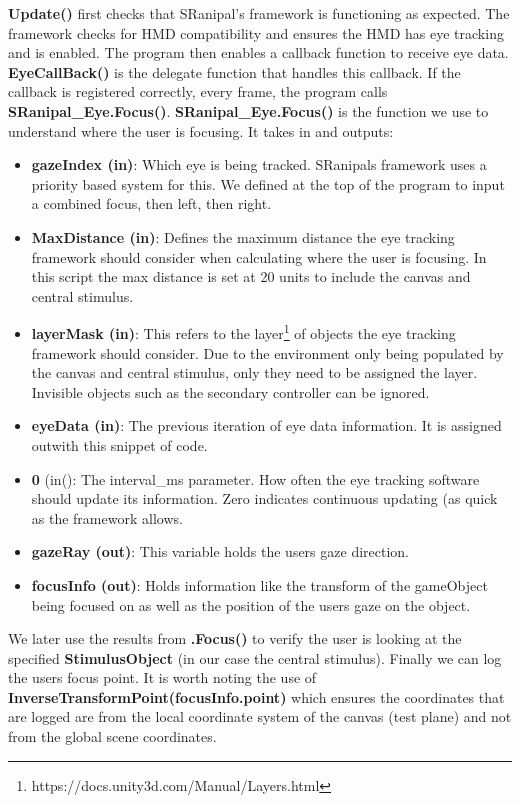 \documentclass{l4proj}
\begin{document}
\textbf{Update()} first checks that SRanipal's framework is functioning as expected. The framework checks for HMD compatibility and ensures the HMD has eye tracking and is enabled. The program then enables a callback function to receive eye data. \textbf{EyeCallBack()} is the delegate function that handles this callback. If the callback is registered correctly, every frame, the program calls \textbf{SRanipal\_Eye.Focus()}. 
\newline
\textbf{SRanipal\_Eye.Focus()} is the function we use to understand where the user is focusing. It takes in and outputs:
\begin{itemize}
    \item \textbf{gazeIndex (in)}: Which eye is being tracked. SRanipals framework uses a priority based system for this. We defined at the top of the program to input a combined focus, then left, then right.
    \item \textbf{MaxDistance (in)}: Defines the maximum distance the eye tracking framework should consider when calculating where the user is focusing. In this script the max distance is set at 20 units to include the canvas and central stimulus.
    \item \textbf{layerMask (in)}: This refers to the layer\footnote{https://docs.unity3d.com/Manual/Layers.html} of objects the eye tracking framework should consider. Due to the environment  only being populated by the canvas and central stimulus, only they need to be assigned the layer. Invisible objects such as the secondary controller can be ignored.
    \item \textbf{eyeData (in)}: The previous iteration of eye data information. It is assigned outwith this snippet of code.
    \item \textbf{0} (in(): The interval\_ms parameter. How often the eye tracking software should update its information. Zero indicates continuous updating (as quick as the framework allows.
    \item \textbf{gazeRay (out)}: This variable holds the users gaze direction.
    \item \textbf{focusInfo (out)}: Holds information like the transform of the gameObject being focused on as well as the position of the users gaze on the object.
\end{itemize}

We later use the results from \textbf{.Focus()} to verify the user is looking at the specified \textbf{StimulusObject} (in our case the central stimulus). Finally we can log the users focus point. It is worth noting the use of \textbf{InverseTransformPoint(focusInfo.point)} which ensures the coordinates that are logged are from the local coordinate system of the canvas (test plane) and not from the global scene coordinates.
\end{document}
